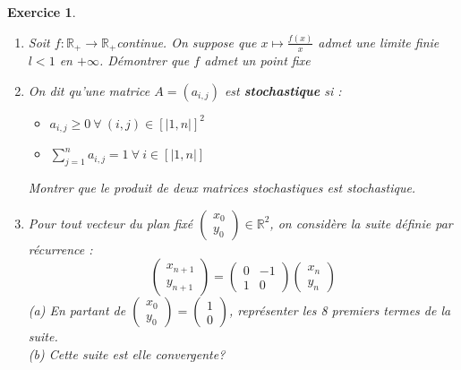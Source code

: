 \documentclass[a4paper,11pt]{article}
\newtheorem{exer}{Exercice} %
\begin{document}
	
\begin{exer}
\begin{enumerate}
\item Soit $f: \mathbb{R}_{+} \rightarrow \mathbb{R}_{+}$continue. On suppose que $x \mapsto \frac{f(x)}{x}$ admet une limite finie $l<1$ en $+\infty$. Démontrer que $f$ admet un point fixe
\item 
On dit qu'une matrice $A=(a_{i,j})$ est \textbf{stochastique} si :
\begin{itemize}
\item $a_{i,j} \geq 0 \ \forall \ (i,j) \in [|1,n|]^2$
\item $\displaystyle\sum_{j=1}^{n}{a_{i,j}} = 1 \ \forall \ i \in [|1,n|]$
\end{itemize}
Montrer que le produit de deux matrices stochastiques est stochastique.
\item Pour tout vecteur du plan fixé $\left(\begin{array}{c}x_0 \\ y_0\end{array}\right) \in \mathbb{R}^2$, on considère la suite définie par récurrence :
$$
\left(\begin{array}{l}
x_{n+1} \\
y_{n+1}
\end{array}\right)=\left(\begin{array}{cc}
0 & -1 \\
1 & 0
\end{array}\right)\left(\begin{array}{l}
x_n \\
y_n
\end{array}\right)
$$
(a) En partant de $\left(\begin{array}{l}x_0 \\ y_0\end{array}\right)=\left(\begin{array}{l}1 \\ 0\end{array}\right)$, représenter les 8 premiers termes de la suite. \\
(b) Cette suite est elle convergente?
\end{enumerate}
\end{exer}
	
\end{document}
